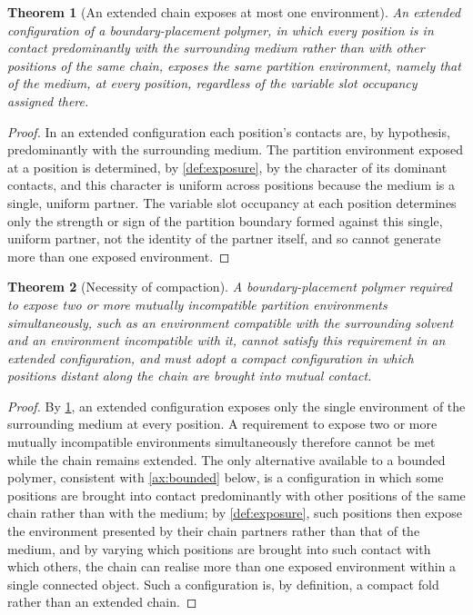 \documentclass[11pt,twocolumn,a4paper]{article}
\theoremstyle{plain}
\newtheorem{theorem}{Theorem}[section]
\theoremstyle{definition}
\theoremstyle{remark}
\begin{document}
\begin{theorem}[An extended chain exposes at most one environment]
\label{thm:extended-limit}
An extended configuration of a boundary-placement polymer, in which every
position is in contact predominantly with the surrounding medium rather
than with other positions of the same chain, exposes the same partition
environment, namely that of the medium, at every position, regardless of
the variable slot occupancy assigned there.
\end{theorem}

\begin{proof}
In an extended configuration each position's contacts are, by hypothesis,
predominantly with the surrounding medium. The partition environment
exposed at a position is determined, by \cref{def:exposure}, by the
character of its dominant contacts, and this character is uniform across
positions because the medium is a single, uniform partner. The variable
slot occupancy at each position determines only the strength or sign of the
partition boundary formed against this single, uniform partner, not the
identity of the partner itself, and so cannot generate more than one
exposed environment.
\end{proof}

\begin{theorem}[Necessity of compaction]
\label{thm:compaction}
A boundary-placement polymer required to expose two or more mutually
incompatible partition environments simultaneously, such as an environment
compatible with the surrounding solvent and an environment incompatible
with it, cannot satisfy this requirement in an extended configuration, and
must adopt a compact configuration in which positions distant along the
chain are brought into mutual contact.
\end{theorem}

\begin{proof}
By \cref{thm:extended-limit}, an extended configuration exposes only the
single environment of the surrounding medium at every position. A
requirement to expose two or more mutually incompatible environments
simultaneously therefore cannot be met while the chain remains extended.
The only alternative available to a bounded polymer, consistent with
\cref{ax:bounded} below, is a configuration in which some positions are
brought into contact predominantly with other positions of the same chain
rather than with the medium; by \cref{def:exposure}, such positions then
expose the environment presented by their chain partners rather than that
of the medium, and by varying which positions are brought into such contact
with which others, the chain can realise more than one exposed environment
within a single connected object. Such a configuration is, by definition, a
compact fold rather than an extended chain.
\end{proof}
\end{document}
